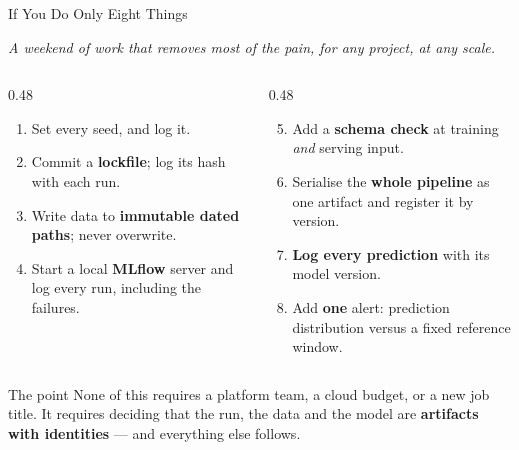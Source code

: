 \begin{frame}{If You Do Only Eight Things}

    \centering
    \textit{A weekend of work that removes most of the pain, for any project, at any scale.}
    \vspace{0.18em}

    \begin{columns}[T]
        \begin{column}{0.48\textwidth}
            \begin{tcolorbox}[colback=green!5, colframe=green!50!black, title=\scriptsize This week]
                \scriptsize
                \begin{enumerate}
                    \item Set every seed, and log it.
                    \item Commit a \textbf{lockfile}; log its hash with each run.
                    \item Write data to \textbf{immutable dated paths}; never overwrite.
                    \item Start a local \textbf{MLflow} server and log every run, including the failures.
                \end{enumerate}
            \end{tcolorbox}
        \end{column}
        \begin{column}{0.48\textwidth}
            \begin{tcolorbox}[colback=blue!5, colframe=blue!50, title=\scriptsize This month]
                \scriptsize
                \begin{enumerate}
                    \setcounter{enumi}{4}
                    \item Add a \textbf{schema check} at training \emph{and} serving input.
                    \item Serialise the \textbf{whole pipeline} as one artifact and register it by version.
                    \item \textbf{Log every prediction} with its model version.
                    \item Add \textbf{one} alert: prediction distribution versus a fixed reference window.
                \end{enumerate}
            \end{tcolorbox}
        \end{column}
    \end{columns}

    \vspace{0.24em}
    \begin{block}{The point}
        None of this requires a platform team, a cloud budget, or a new job title. It requires deciding that
        the run, the data and the model are \textbf{artifacts with identities} --- and everything else follows.
    \end{block}

\end{frame}

